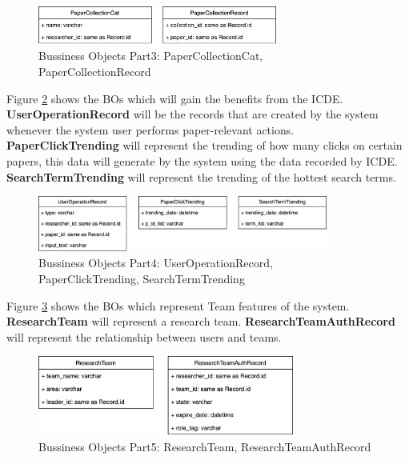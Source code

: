 \begin{figure}[t]
	\centering
	\includegraphics[width=0.7\textwidth]{./img/bo_classes_3.png}
	\caption{Bussiness Objects Part3: PaperCollectionCat, PaperCollectionRecord}

	\label{fig:bo_classes_3}
\end{figure}

Figure \ref{fig:bo_classes_4} shows the BOs which will gain the benefits from the ICDE.
\textbf{UserOperationRecord} will be the records that are created by the system whenever the system user performs paper-relevant actions.
\textbf{PaperClickTrending} will represent the trending of how many clicks on certain papers,
this data will generate by the system using the data recorded by ICDE.
\textbf{SearchTermTrending} will represent the trending of the hottest search terms.

\begin{figure}[t]
	\centering
	\includegraphics[width=0.85\textwidth]{./img/bo_classes_4.png}
	\caption{Bussiness Objects Part4: UserOperationRecord,\\ PaperClickTrending, SearchTermTrending}

	\label{fig:bo_classes_4}
\end{figure}


Figure \ref{fig:bo_classes_5} shows the BOs which represent Team features of the system.
\textbf{ResearchTeam} will represent a research team.
\textbf{ResearchTeamAuthRecord} will represent the relationship between users and teams.

\begin{figure}[t]
	\centering
	\includegraphics[width=0.75\textwidth]{./img/bo_classes_5.png}
	\caption{Bussiness Objects Part5: ResearchTeam, ResearchTeamAuthRecord}

	\label{fig:bo_classes_5}
\end{figure}

